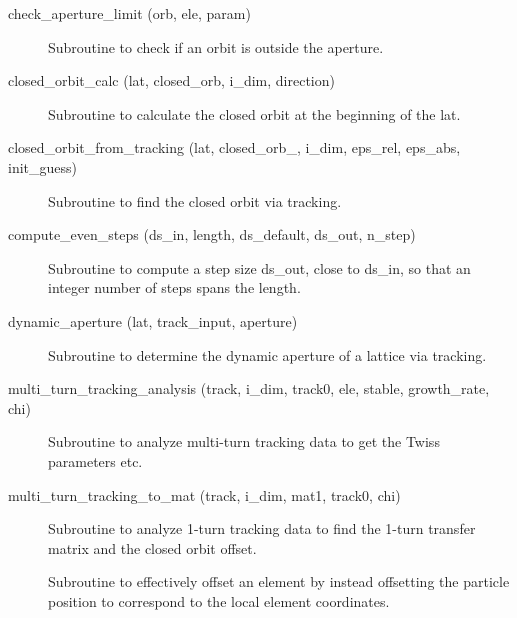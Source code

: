 \begin{description}

\label{r:check.aperture.limit}
\item[check_aperture_limit (orb, ele, param)] \Newline
Subroutine to check if an orbit is outside the aperture. 

\label{r:closed.orbit.calc}
\item[closed_orbit_calc (lat, closed_orb, i_dim, direction)] \Newline 
Subroutine to calculate the closed orbit at the beginning of the lat.

\label{r:closed.orbit.from.tracking}
\item[closed_orbit_from_tracking (lat, closed_orb_, i_dim, 
eps_rel, eps_abs, init_guess)] \Newline
Subroutine to find the closed orbit via tracking. 

\label{r:compute.even.steps}
\item[compute_even_steps (ds_in, length, ds_default, ds_out, n_step)] \Newline 
Subroutine to compute a step size ds_out, close to ds_in, so that an 
integer number of steps spans the length.

\label{r:dynamic.aperture}
\item[dynamic_aperture (lat, track_input, aperture)] \Newline
Subroutine to determine the dynamic aperture of a lattice via tracking. 

\label{r:multi.turn.tracking.analysis}
\item[multi_turn_tracking_analysis (track, i_dim, track0, ele, 
stable, growth_rate, chi)] \Newline
Subroutine to analyze multi-turn tracking data to get the Twiss
parameters etc.

\label{r:multi.turn.tracking.to.mat}
\item[multi_turn_tracking_to_mat (track, i_dim, 
mat1, track0, chi)] \Newline
Subroutine to analyze 1-turn tracking data to find the 1-turn transfer
matrix and the closed orbit offset.

\label{r:offset.particle}
\item[\protect\parbox{6in}{offset_particle (ele, param, coord, set, set_canonical, \\
\hspace*{2in} set_tilt, set_multipoles, set_hvkicks, s_pos)}] \Newline
Subroutine to effectively offset an element by instead offsetting 
the particle position to correspond to the local element coordinates. 


\end{description}
